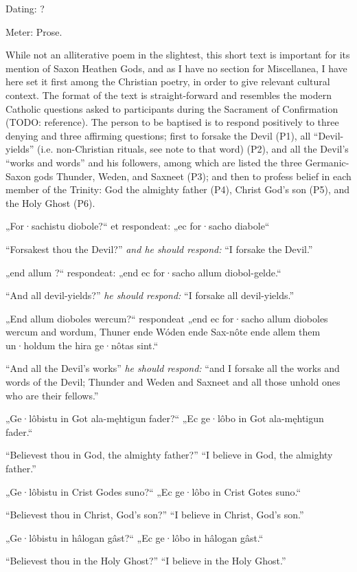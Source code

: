 
\begin{flushright}%
Dating: ?

Meter: Prose.
\end{flushright}%

While not an alliterative poem in the slightest, this short text is important for its mention of Saxon Heathen Gods, and as I have no section for Miscellanea, I have here set it first among the Christian poetry, in order to give relevant cultural context.  The format of the text is straight-forward and resembles the modern Catholic questions asked to participants during the Sacrament of Confirmation (TODO: reference).  The person to be baptised is to respond positively to three denying and three affirming questions; first to forsake the Devil (P1), all “Devil-yields” (i.e. non-Christian rituals, see note to that word) (P2), and all the Devil’s “works and words” and his followers, among which are listed the three Germanic-Saxon gods Thunder, Weden, and Saxneet (P3); and then to profess belief in each member of the Trinity: God the almighty father (P4), Christ God’s son (P5), and the Holy Ghost (P6).

\sectionline

\bpg
\bpa „For·sachistu diobole?“ et respondeat: „ec for·sacho diabole“\epa

\bpb “Forsakest thou the Devil?” \emph{and he should respond:} “I forsake the Devil.”\epb\epg


\bpg
\bpa „end allum ?“ respondeat: „end ec for·sacho allum diobol-gelde.“\epa

\bpb “And all devil-yields?” \emph{he should respond:} “I forsake all devil-yields.”\epb\epg


\bpg
\bpa „End allum dioboles wercum?“ respondeat „end ec for·sacho allum dioboles wercum and wordum, Thuner ende Wóden ende Sax-nôte ende allem them un·holdum the hira ge·nôtas sint.“\epa

\bpb “And all the Devil’s works” \emph{he should respond:} “and I forsake all the works and words of the Devil; Thunder and Weden and Saxneet and all those unhold ones who are their fellows.”\epb\epg


\bpg
\bpa „Ge·lôbistu in Got ala-męhtigun fader?“ „Ec ge·lôbo in Got ala-męhtigun fader.“\epa

\bpb “Believest thou in God, the almighty father?” “I believe in God, the almighty father.”\epb\epg


\bpg
\bpa „Ge·lôbistu in Crist Godes suno?“ „Ec ge·lôbo in Crist Gotes suno.“\epa

\bpb “Believest thou in Christ, God’s son?” “I believe in Christ, God’s son.”\epb\epg


\bpg
\bpa „Ge·lôbistu in hâlogan gâst?“ „Ec ge·lôbo in hâlogan gâst.“\epa

\bpb “Believest thou in the Holy Ghost?” “I believe in the Holy Ghost.”\epb\epg

\sectionline

